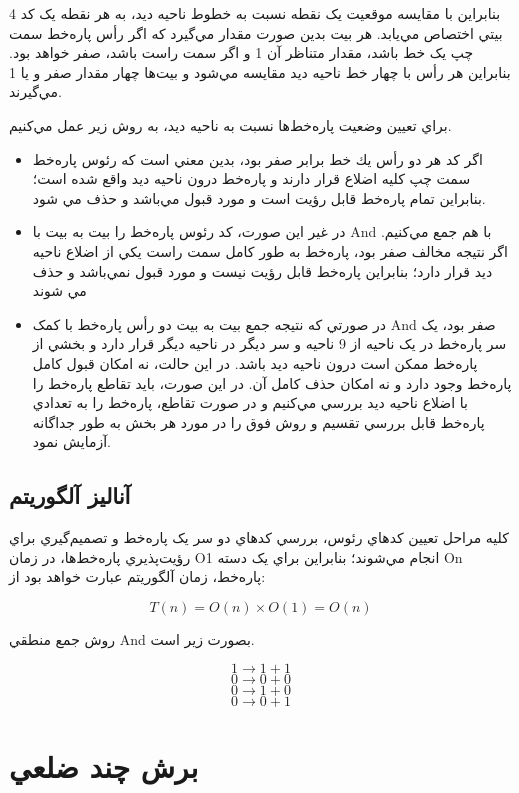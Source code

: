 \documentclass{book}
\begin{document}
بنابراين با مقايسه موقعيت يک نقطه نسبت به خطوط ناحيه ديد، به هر نقطه يک كد 4 بيتي اختصاص مي‌يابد. هر بيت بدين صورت مقدار مي‌گيرد که اگر رأس پاره‌خط سمت چپ يک خط باشد، مقدار متناظر آن 1 و اگر سمت راست باشد، صفر خواهد بود. بنابراين هر رأس با چهار خط ناحيه ديد مقايسه مي‌شود و بيت‌ها چهار مقدار صفر و يا 1 مي‌گيرند.

براي تعيين وضعيت پاره‌خط‌ها نسبت به ناحيه ديد، به روش زير عمل مي‌کنيم. 

\begin{itemize}
    \item
    اگر كد هر دو رأس يك خط برابر صفر بود، بدين معني است که رئوس پاره‌خط سمت چپ کليه اضلاع قرار دارند و پاره‌خط درون ناحيه ديد واقع شده است؛ بنابراين تمام پاره‌خط قابل رؤيت است و مورد قبول مي‌باشد و حذف مي شود.
    \item
    در غير اين صورت، كد رئوس پاره‌خط را بيت به بيت با And با هم جمع مي‌كنيم. اگر نتيجه مخالف صفر بود، پاره‌خط به طور کامل سمت راست يکي از اضلاع ناحيه ديد قرار دارد؛ بنابراين پاره‌خط قابل رؤيت نيست و مورد قبول نمي‌باشد و حذف مي شوند
    \item
    در صورتي که نتيجه جمع بيت به بيت دو رأس پاره‌خط با کمک And صفر بود، يک سر پاره‌خط در يک ناحيه از 9 ناحيه و سر ديگر در ناحيه ديگر قرار دارد و بخشي از پاره‌خط ممکن است درون ناحيه ديد باشد. در اين حالت، نه امکان قبول کامل پاره‌خط وجود دارد و نه امکان حذف کامل آن. در اين صورت، بايد تقاطع پاره‌خط را با اضلاع ناحيه ديد بررسي مي‌کنيم و در صورت تقاطع، پاره‌خط را به تعدادي پاره‌خط قابل بررسي تقسيم و روش فوق را در مورد هر بخش به طور جداگانه آزمايش نمود. 
\end{itemize}

\subsection{آناليز آلگوريتم}

کليه مراحل تعيين کدهاي رئوس، بررسي کدهاي دو سر يک پاره‌خط و تصميم‌گيري براي رؤيت‌پذيري پاره‌خط‌ها، در زمان O1 انجام مي‌شوند؛ بنابراين براي يک دسته On پاره‌خط، زمان آلگوريتم عبارت خواهد بود از: 

$$T(n)=O(n)\times O(1)=O(n)$$

روش جمع منطقي And بصورت زير است.

$$1 \rightarrow 1+1$$
$$0 \rightarrow 0+0$$
$$0 \rightarrow 1+0$$
$$0 \rightarrow 0+1$$

\section{برش چند ضلعي}
\end{document}
